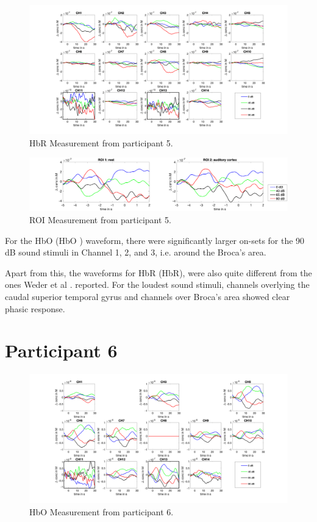 \begin{figure}[H]
  \centering
    \includegraphics[scale=.4]{bilder/HbR_Mole/sub_lukas_s_HbR.png}
  \caption{HbR Measurement from participant 5.}
  \label{fig:somesignal}
\end{figure}

\begin{figure}[H]
  \centering
    \includegraphics[scale=.29]{bilder/ROI/sub_lukas_s_HbO.png}
  \caption{ROI Measurement from participant 5.}
\end{figure}

For the \acrlong{HbO} (\acrshort{HbO} ) waveform, there were significantly larger on-sets for the 90 dB sound stimuli in Channel 1, 2, and 3, i.e. around the Broca's area.

Apart from this, the waveforms for \acrlong{HbR} (\acrshort{HbR}), were also quite different from the ones Weder et al \citeyearpar{Weder2018}. reported. For the loudest sound stimuli, channels overlying the caudal superior temporal gyrus and channels over Broca's area showed clear phasic response. 


\newpage




\section {Participant 6}
\begin{figure}[H]
  \centering
    \includegraphics[scale=.4]{bilder/HbO_Mole/sub_shelia_s_HbO.png}
  \caption{HbO Measurement from participant 6.}
  \label{fig:somesignal}
\end{figure}

